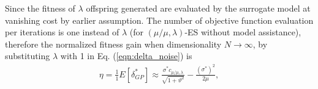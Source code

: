 

Since the fitness of $\lambda$ offspring generated are evaluated by the surrogate model at vanishing cost by earlier assumption. The number of objective function evaluation per iterations is one instead of $\lambda$ (for $(\mu/\mu,\lambda)$-ES without model assistance), therefore the normalized fitness gain when dimensionality $N \rightarrow \infty$, by substituting $\lambda$ with 1 in Eq. (\ref{eqn:delta_noise}) is 
\begin{align}\label{eqn:eta_surrogate}{}
\eta = \frac{1}{1}E[ \delta_{GP}^*] \approx  \frac{\sigma^* c_{\mu / \mu, \lambda}}{\sqrt {1+ \vartheta^2}} - \frac{(\sigma^*)^2}{2 \mu} ,
\end{align}

